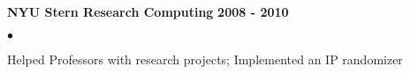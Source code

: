 \documentclass[margin,line]{res}
\newenvironment{list2}{
  \begin{list}{$\bullet$}{%
      \setlength{\itemsep}{0.05in}
      \setlength{\parsep}{0in} \setlength{\parskip}{0in}
      \setlength{\topsep}{0in} \setlength{\partopsep}{0in} 
      \setlength{\leftmargin}{0.2in}}}{\end{list}}
\begin{document}
\begin{resume}
{\bf NYU Stern Research Computing} \hfill {\bf 2008 - 2010}\\
\begin{list2}
\item Helped Professors with research projects; Implemented an IP randomizer 
\end{list2}


\end{resume}
\end{document}
